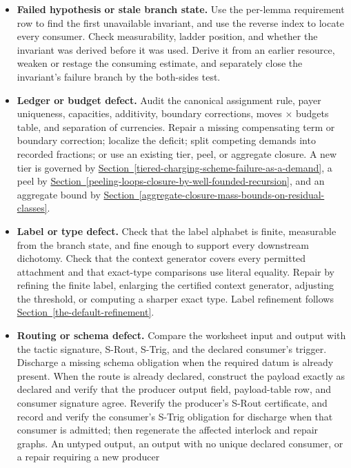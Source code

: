 \documentclass[
  11pt,
]{article}
\theoremstyle{definition}
\newcommand{\secref}[1]{\hyperref[#1]{Section~\ref*{#1}}}
\begin{document}
\begin{enumerate}
  \begin{itemize}
  \item
    \textbf{Failed hypothesis or stale branch state.} Use the
    per-lemma requirement row to find the first unavailable invariant,
    and use the reverse index to locate every consumer. Check
    measurability, ladder position, and whether the invariant was derived
    before it was used. Derive it from an earlier resource, weaken or
    restage the consuming estimate, and separately close the invariant's
    failure branch by the both-sides test.
  \item
    \textbf{Ledger or budget defect.} Audit the canonical assignment rule,
    payer uniqueness, capacities, additivity, boundary corrections,
    moves \(\times\) budgets table, and separation of currencies.
    Repair a missing compensating term or boundary correction; localize
    the deficit; split competing demands into recorded fractions; or use
    an existing tier, peel, or aggregate closure. A new tier is governed
    by \secref{tiered-charging-scheme-failure-as-a-demand}, a peel by
    \secref{peeling-loops-closure-by-well-founded-recursion}, and an
    aggregate bound by
    \secref{aggregate-closure-mass-bounds-on-residual-classes}.
  \item
    \textbf{Label or type defect.} Check that the label alphabet is
    finite, measurable from the branch state, and fine enough to support
    every downstream dichotomy. Check that the context generator covers
    every permitted attachment and that exact-type comparisons use
    literal equality. Repair by refining the finite label, enlarging the
    certified context generator, adjusting the threshold, or computing
    a sharper exact type. Label refinement follows
    \secref{the-default-refinement}.
  \item
    \textbf{Routing or schema defect.} Compare the worksheet input and
    output with the tactic signature, S-Rout, S-Trig, and the declared
    consumer's trigger. Discharge a missing schema obligation when the
    required datum is already present. When the route is already
    declared, construct the payload exactly as declared and verify that
    the producer output field, payload-table row, and consumer signature
    agree. Reverify the producer's S-Rout certificate, and record and
    verify the consumer's S-Trig obligation for discharge when that
    consumer is admitted; then regenerate the affected interlock and
    repair graphs. An untyped output, an output with no
    unique declared consumer, or a repair requiring a new producer

\end{itemize}
\end{enumerate}
\end{document}
